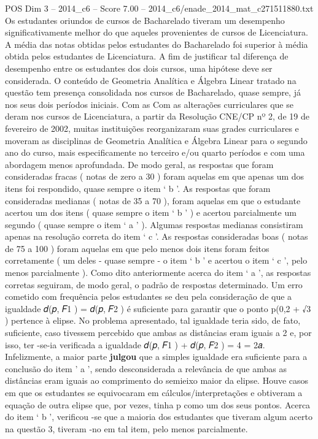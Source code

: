 \begin{textsample}{POS Dim 3 – 2014\_c6 – Score 7.00 – 2014\_c6/enade\_2014\_mat\_c271511880.txt}
Os estudantes oriundos de cursos de Bacharelado tiveram um desempenho significativamente melhor do que aqueles provenientes de cursos de Licenciatura.
A média das notas obtidas pelos estudantes do Bacharelado foi superior à média obtida pelos estudantes de Licenciatura.
A fim de justificar tal diferença de desempenho entre os estudantes dos dois cursos, uma hipótese deve ser considerada.
O conteúdo de Geometria Analítica e Álgebra Linear tratado na questão tem presença consolidada nos cursos de Bacharelado, quase sempre, já nos seus dois períodos iniciais.
Com as Com as alterações curriculares que se deram nos cursos de Licenciatura, a partir da Resolução CNE/CP nº 2, de 19 de fevereiro de 2002, muitas instituições reorganizaram suas grades curriculares e moveram as disciplinas de Geometria Analítica e Álgebra Linear para o segundo ano do curso, mais especificamente no terceiro e/ou quarto períodos e com uma abordagem menos aprofundada.
De modo geral, as respostas que foram consideradas fracas ( notas de zero a 30 ) foram aquelas em que apenas um dos itens foi respondido, quase sempre o item ‘ b ’.
As respostas que foram consideradas medianas ( notas de 35 a 70 ), foram aquelas em que o estudante acertou um dos itens ( quase sempre o item ‘ b ’ ) e acertou parcialmente um segundo ( quase sempre o item ‘ a ’ ).
Algumas respostas medianas consistiram apenas na resolução correta do item ‘ c ’.
As respostas consideradas boas ( notas de 75 a 100 ) foram aquelas em que pelo menos dois itens foram feitos corretamente ( um deles - quase sempre - o item ‘ b ’ e acertou o item ‘ c ’, pelo menos parcialmente ).
Como dito anteriormente acerca do item ‘ a ’, as respostas corretas seguiram, de modo geral, o padrão de respostas determinado.
Um erro cometido com frequência pelos estudantes se deu pela consideração de que a igualdade 𝑑(𝑝, 𝐹1 ) = 𝑑(𝑝, 𝐹2 ) é suficiente para garantir que o ponto p(0,2 + √3 ) pertence à elipse.
No problema apresentado, tal igualdade teria sido, de fato, suficiente, caso tivessem percebido que ambas as distâncias eram iguais a 2 e, por isso, ter -se-ia verificada a igualdade 𝑑(𝑝, 𝐹1 ) + 𝑑(𝑝, 𝐹2 ) = 4 = 2𝑎.
Infelizmente, a maior parte \textbf{julgou} que a simples igualdade era suficiente para a conclusão do item ’ a ’, sendo desconsiderada a relevância de que ambas as distâncias eram iguais ao comprimento do semieixo maior da elipse.
Houve casos em que os estudantes se equivocaram em cálculos/interpretações e obtiveram a equação de outra elipse que, por vezes, tinha p como um dos seus pontos.
Acerca do item ‘ b ’, verificou -se que a maioria dos estudantes que tiveram algum acerto na questão 3, tiveram -no em tal item, pelo menos parcialmente.

\end{textsample}
